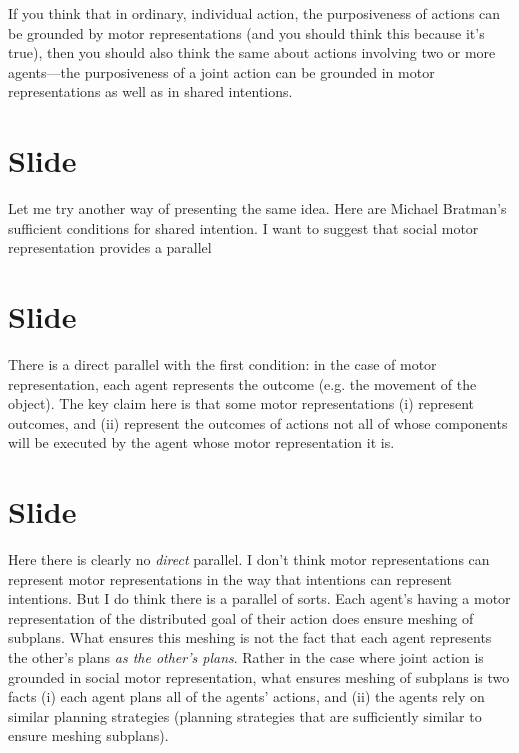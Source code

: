 \documentclass[12pt,\papersize]{extarticle}
\begin{document}
If you think that in ordinary, individual action, the purposiveness of actions can be grounded by motor representations
(and you should think this because it’s true),
then you should also think the same about actions involving two or more agents---the purposiveness of a joint action can be grounded in motor representations as well as in shared intentions.



\section{Slide}
Let me try another way of presenting the same idea.
Here are Michael Bratman’s sufficient conditions for shared intention.
I want to suggest that social motor representation provides a parallel



\section{Slide}
There is a direct parallel with the first condition: in the case of motor representation, each agent represents the outcome (e.g. the movement of the object).
The key claim here is that some motor representations (i) represent outcomes, and (ii) represent the outcomes of actions not all of whose components will be executed by the agent whose motor representation it is.



\section{Slide}
Here there is clearly no \emph{direct} parallel. 
I don’t think motor representations can represent motor representations in the way that intentions can represent intentions.
But I do think there is a parallel of sorts.
Each agent’s having a motor representation of the distributed goal of their action does ensure meshing of subplans.
What ensures this meshing is not the fact that each agent represents the other's plans \emph{as the other's plans}.
Rather in the case where joint action is grounded in social motor representation, what ensures meshing of subplans is two facts (i) each agent plans all of the agents’ actions, and (ii) the agents rely on similar planning strategies (planning strategies that are sufficiently similar to ensure meshing subplans).
\end{document}
